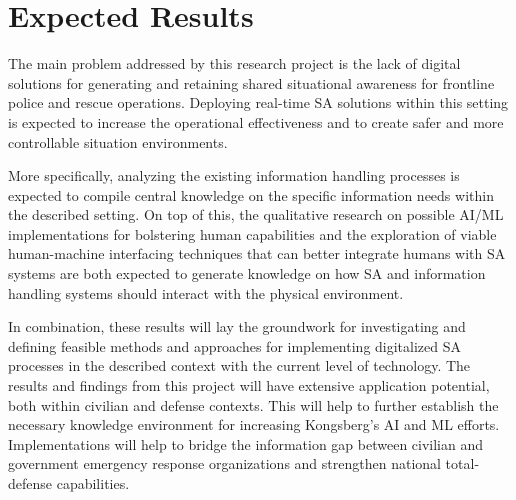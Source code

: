 \chapter{Expected Results}

The main problem addressed by this research project is the lack of digital solutions for generating and retaining shared situational awareness for frontline police and rescue operations. Deploying real-time SA solutions within this setting is expected to increase the operational effectiveness and to create safer and more controllable situation environments. 

More specifically, analyzing the existing information handling processes is expected to compile central knowledge on the specific information needs within the described setting. On top of this, the qualitative research on possible AI/ML implementations for bolstering human capabilities and the exploration of viable human-machine interfacing techniques that can better integrate humans with SA systems are both expected to generate knowledge on how SA and information handling systems should interact with the physical environment. 

In combination, these results will lay the groundwork for investigating and defining feasible methods and approaches for implementing digitalized SA processes in the described context with the current level of technology. The results and findings from this project will have extensive application potential, both within civilian and defense contexts. This will help to further establish the necessary knowledge environment for increasing Kongsberg’s AI and ML efforts. Implementations will help to bridge the information gap between civilian and government emergency response organizations and strengthen national total-defense capabilities. 
